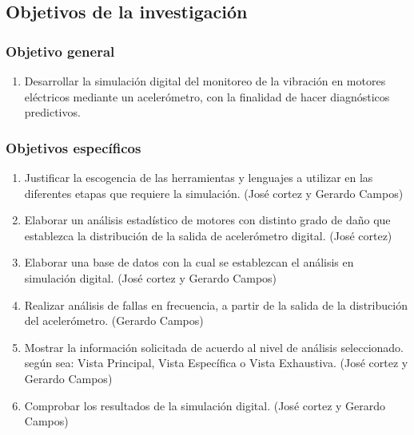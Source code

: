 \subsection{Objetivos de la investigación}

\subsubsection{Objetivo general}
	\begin{enumerate}
		\item  Desarrollar la simulación digital del monitoreo de la vibración en motores eléctricos mediante un acelerómetro, con la finalidad de hacer diagnósticos predictivos.
	\end{enumerate}
	
\subsubsection{Objetivos específicos}

	\begin{enumerate}
		\item Justificar la escogencia de las herramientas y lenguajes a utilizar en las diferentes etapas que requiere la simulación. (José cortez y Gerardo Campos)

		\item Elaborar un análisis estadístico de motores con distinto grado de daño que establezca la distribución de la salida de acelerómetro digital. (José cortez)

		\item Elaborar una base de datos con la cual se establezcan el análisis  en simulación digital. (José cortez y Gerardo Campos) 
		
		\item Realizar análisis de fallas en frecuencia, a partir de la salida de la distribución del acelerómetro. (Gerardo Campos)

		\item Mostrar la información solicitada de acuerdo al nivel de análisis seleccionado. según sea: Vista Principal, Vista Específica o Vista Exhaustiva. (José cortez y Gerardo Campos)

		\item Comprobar los resultados de la simulación digital. (José cortez y Gerardo Campos)
	\end{enumerate}

	
